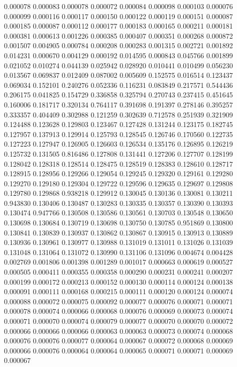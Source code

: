 0.000078
0.000083
0.000078
0.000072
0.000084
0.000098
0.000103
0.000076
0.000099
0.000116
0.000117
0.000150
0.000122
0.000119
0.000151
0.000087
0.000185
0.000087
0.000112
0.000177
0.000183
0.000165
0.000211
0.000181
0.000381
0.000613
0.001226
0.000385
0.000407
0.000351
0.000268
0.000872
0.001507
0.004905
0.000784
0.000208
0.000283
0.001315
0.002721
0.001892
0.014231
0.000670
0.004129
0.000192
0.014595
0.000843
0.045766
0.001899
0.021052
0.010274
0.044139
0.025942
0.028920
0.010441
0.010499
0.056230
0.013567
0.069837
0.012409
0.087002
0.005609
0.152575
0.016514
0.123437
0.069034
0.152101
0.240276
0.052336
0.116231
0.083849
0.217571
0.544436
0.206175
0.041825
0.154729
0.336858
0.325794
0.270743
0.237415
0.451645
0.160006
0.181717
0.320134
0.764117
0.391698
0.191397
0.278146
0.395257
0.333357
0.404409
0.302988
0.121259
0.302639
0.712578
0.251939
0.321909
0.124488
0.123628
0.129803
0.123467
0.127428
0.131244
0.123175
0.182745
0.127957
0.137913
0.129914
0.125793
0.128545
0.126746
0.170560
0.122735
0.127223
0.127947
0.126905
0.126603
0.126534
0.135176
0.126895
0.126219
0.125732
0.131505
0.816486
0.127808
0.131441
0.127206
0.127707
0.128199
0.128042
0.128318
0.128514
0.128475
0.128519
0.128383
0.128610
0.128717
0.128915
0.128956
0.129266
0.129054
0.129245
0.129320
0.129161
0.129280
0.129270
0.129180
0.129304
0.129722
0.129596
0.129635
0.129697
0.129808
0.129780
0.129868
0.938218
0.129912
0.130045
0.130136
0.130081
0.130211
0.943830
0.130406
0.130487
0.130283
0.130335
0.130357
0.130390
0.130393
0.130474
0.947766
0.130508
0.130586
0.130561
0.130703
0.130548
0.130650
0.130698
0.130684
0.130719
0.130698
0.130750
0.130785
0.951869
0.130800
0.130841
0.130839
0.130937
0.130862
0.130867
0.130915
0.130913
0.130889
0.130936
0.130961
0.130977
0.130988
0.131019
0.131011
0.131026
0.131039
0.131048
0.131064
0.131072
0.130990
0.131106
0.131096
0.004674
0.004428
0.002769
0.001806
0.001398
0.001289
0.001017
0.000663
0.000619
0.000527
0.000505
0.000411
0.000355
0.000358
0.000290
0.000231
0.000241
0.000207
0.000199
0.000172
0.000213
0.000152
0.000130
0.000114
0.000124
0.000138
0.000091
0.000111
0.000168
0.000215
0.000111
0.000120
0.000124
0.000074
0.000088
0.000072
0.000075
0.000092
0.000077
0.000076
0.000071
0.000071
0.000078
0.000074
0.000066
0.000068
0.000076
0.000069
0.000073
0.000074
0.000071
0.000070
0.000074
0.000079
0.000077
0.000070
0.000070
0.000072
0.000066
0.000066
0.000066
0.000063
0.000063
0.000073
0.000074
0.000068
0.000076
0.000076
0.000077
0.000064
0.000067
0.000072
0.000068
0.000069
0.000066
0.000076
0.000064
0.000064
0.000065
0.000071
0.000071
0.000069
0.000067
